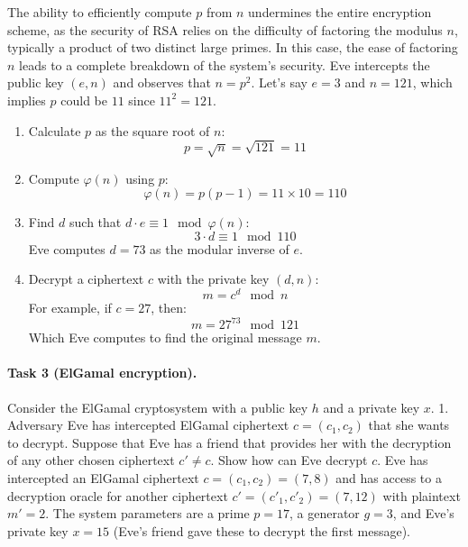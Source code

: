 \documentclass{article}
\begin{document}
The ability to efficiently compute \( p \) from \( n \) undermines the entire encryption scheme, as the security of RSA relies on the difficulty of factoring the modulus \( n \), typically a product of two distinct large primes. In this case, the ease of factoring \( n \) leads to a complete breakdown of the system's security.
Eve intercepts the public key \( (e, n) \) and observes that \( n = p^2 \). Let's say \( e = 3 \) and \( n = 121 \), which implies \( p \) could be \( 11 \) since \( 11^2 = 121 \).

\begin{enumerate}
    \item Calculate \( p \) as the square root of \( n \):
    \[ p = \sqrt{n} = \sqrt{121} = 11 \]
    \item Compute \( \varphi(n) \) using \( p \):
    \[ \varphi(n) = p(p - 1) = 11 \times 10 = 110 \]
    \item Find \( d \) such that \( d \cdot e \equiv 1 \mod \varphi(n) \):
    \[ 3 \cdot d \equiv 1 \mod 110 \]
    Eve computes \( d = 73 \) as the modular inverse of \( e \).
    \item Decrypt a ciphertext \( c \) with the private key \( (d, n) \):
    \[ m = c^d \mod n \]
    For example, if \( c = 27 \), then:
    \[ m = 27^{73} \mod 121 \]
    Which Eve computes to find the original message \( m \).
\end{enumerate}


\paragraph{Task 3 (ElGamal encryption).} Consider the ElGamal cryptosystem with a public key $h$ and a private key $x$.
1. Adversary Eve has intercepted ElGamal ciphertext $c = (c_1,c_2)$ that she wants to decrypt.
Suppose that Eve has a friend that provides her with the decryption of any other chosen ciphertext $c' \neq c $.
Show how can Eve decrypt $c$.
Eve has intercepted an ElGamal ciphertext \( c = (c_1, c_2) = (7, 8) \) and has access to a decryption oracle for another ciphertext \( c' = (c'_1, c'_2) = (7, 12) \) with plaintext \( m' = 2 \).
The system parameters are a prime \( p = 17 \), a generator \( g = 3 \), and Eve's private key \( x = 15 \) (Eve's friend gave these to decrypt the first message).
\end{document}
